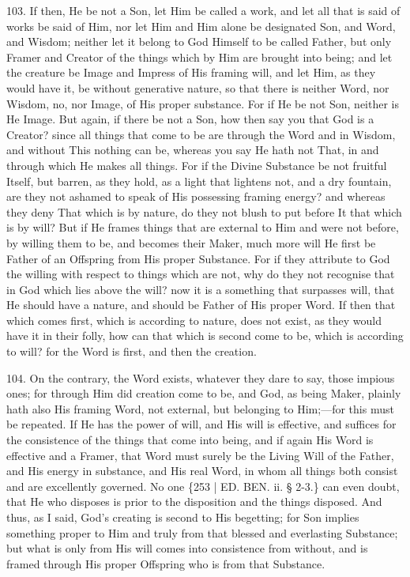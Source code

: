 103. If then, He be not a Son,
let Him be called a work, and let all that is said of works be said of
Him, nor let Him and Him alone be designated Son, and Word, and
Wisdom; neither let it belong to God Himself to be called Father, but
only Framer and Creator of the things which by Him are brought into
being; and let the creature be Image and Impress of His framing will,
and let Him, as they would have it, be without generative nature, so
that there is neither Word, nor Wisdom, no, nor Image, of His
proper substance. For if He be not Son, neither is He Image. But
again, if there be not a Son, how then say you that God is a Creator?
since all things that come to be are through the Word and in Wisdom,
and without This nothing can be, whereas you say He hath not That, in
and through which He makes all things. For if the Divine Substance be
not fruitful Itself, but barren, as they hold, as a light that
lightens not, and a dry fountain, are they not ashamed to speak of His
possessing framing energy? and whereas they deny That which is by
nature, do they not blush to put before It that which is by will? But
if He frames things that are external to Him and were not before, by
willing them to be, and becomes their Maker, much more will He first
be Father of an Offspring from His proper Substance. For if they
attribute to God the willing with respect to things which are not, why
do they not recognise that in God which lies above the will? now it is
a something that surpasses will, that He should have a nature, and
should be Father of His proper Word. If then that which comes first,
which is according to nature, does not exist, as they would have it in
their folly, how can that which is second come to be, which is
according to will? for the Word is first, and then the creation.

104. On the contrary, the Word
exists, whatever they dare to say, those impious ones; for through Him
did creation come to be, and God, as being Maker, plainly hath also
His framing Word, not external, but belonging to Him;—for this must
be repeated. If He has the power of will, and His will is effective,
and suffices for the consistence of the things that come into being,
and if again His Word is effective and a Framer, that Word must surely
be the Living Will of the Father, and His energy in substance, and His
real Word, in whom all things both consist and are excellently
governed. No one \{253 | ED. BEN.
ii. § 2-3.\} can even doubt, that He who disposes is prior to the
disposition and the things disposed. And thus, as I said, God's
creating is second to His begetting; for Son implies something proper
to Him and truly from that blessed and everlasting Substance; but what
is only from His will comes into consistence from without, and is
framed through His proper Offspring who is from that Substance.

